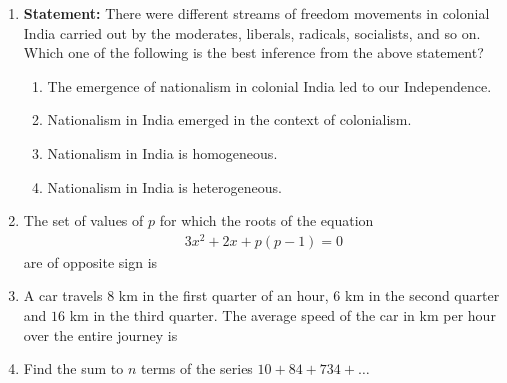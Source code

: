 \documentclass[journal,12pt,onecolumn]{IEEEtran}
\theoremstyle{remark}
\begin{document}
\begin{enumerate}
\item \textbf{Statement:} There were different streams of freedom movements in colonial India carried out by the moderates, liberals, radicals, socialists, and so on.\\
Which one of the following is the best inference from the above statement?
\begin{enumerate}
\item The emergence of nationalism in colonial India led to our Independence.
\item Nationalism in India emerged in the context of colonialism.
\item Nationalism in India is homogeneous.
\item Nationalism in India is heterogeneous.
\end{enumerate}

\item The set of values of $p$ for which the roots of the equation
\begin{align*}
    3x^{2} + 2x + p(p-1) = 0
\end{align*}
are of opposite sign is
\begin{enumerate}
\end{enumerate}

\item A car travels $8$ km in the first quarter of an hour, $6$ km in the second quarter and $16$ km in the third quarter. The average speed of the car in km per hour over the entire journey is
\begin{enumerate}
\end{enumerate}

\item Find the sum to $n$ terms of the series $10 + 84 + 734 + \ldots$
\begin{enumerate}
\begin{multicols}{2}
    


\end{multicols}
\end{enumerate}
\end{enumerate}
\end{document}
